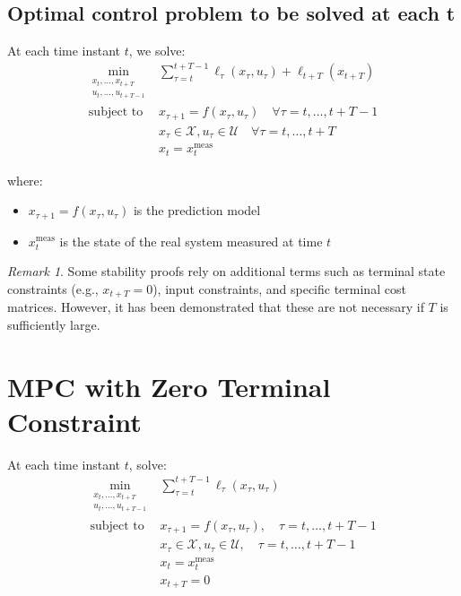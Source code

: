 \documentclass[openany]{book}
\theoremstyle{definition}
\theoremstyle{remark}
\newtheorem*{remark}{Remark}
\begin{document}
\subsection{Optimal control problem to be solved at each t}
At each time instant $t$, we solve:
\begin{align*}
    \min_{\substack{x_t,\ldots,x_{t+T}\\u_t,\ldots,u_{t+T-1}}} & \sum_{\tau=t}^{t+T-1} \ell_\tau(x_\tau, u_\tau) + \ell_{t+T}(x_{t+T})\\
    \text{subject to } & x_{\tau+1} = f(x_\tau, u_\tau) \quad \forall\tau = t,\ldots,t+T-1\\
    & x_\tau \in \mathcal{X}, u_\tau \in \mathcal{U} \quad \forall\tau = t,\ldots,t+T\\
    & x_t = x_t^{\text{meas}}
\end{align*}

where:
\begin{itemize}
    \item $x_{\tau+1} = f(x_\tau, u_\tau)$ is the prediction model
    \item $x_t^{\text{meas}}$ is the state of the real system measured at time $t$
\end{itemize}

\begin{remark}
Some stability proofs rely on additional terms such as terminal state constraints (e.g., $x_{t+T} = 0$), input constraints, and specific terminal cost matrices. However, it has been demonstrated that these are not necessary if $T$ is sufficiently large.
\end{remark}

\section{MPC with Zero Terminal Constraint}
At each time instant $t$, solve:
\begin{align*}
    \min_{\substack{x_t,\ldots,x_{t+T} \\ u_t,\ldots,u_{t+T-1}}} & \sum_{\tau=t}^{t+T-1} \ell_\tau(x_\tau,u_\tau) \\
    \text{subject to } & x_{\tau+1} = f(x_\tau,u_\tau), \quad \tau=t,\ldots,t+T-1 \\
    & x_\tau \in \mathcal{X}, u_\tau \in \mathcal{U}, \quad \tau=t,\ldots,t+T-1 \\
    & x_t = x_t^{\text{meas}} \\
    & x_{t+T} = 0
\end{align*}
\end{document}
